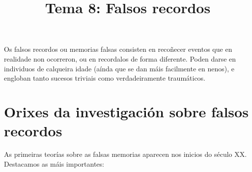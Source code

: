 \documentclass[a4paper,11pt]{article}
\title{Tema 8: Falsos recordos}
\date{}
\begin{document}
  

\maketitle

Os falsos recordos ou memorias falsas consisten en recoñecer eventos que en realidade non ocorreron, ou en recordalos de forma diferente. Poden darse en individuos de calqueira idade (aínda que se dan máis facilmente en nenos), e engloban tanto sucesos triviais como verdadeiramente traumáticos. 

\section{Orixes da investigación sobre falsos recordos}
As primeiras teorías sobre as falsas memorias aparecen nos inicios do século XX. Destacamos as máis importantes:
\end{document}
